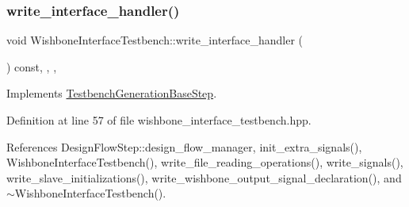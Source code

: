 \subsubsection{\texorpdfstring{write\+\_\+interface\+\_\+handler()}{write\_interface\_handler()}}
{\footnotesize\ttfamily void Wishbone\+Interface\+Testbench\+::write\+\_\+interface\+\_\+handler (\begin{DoxyParamCaption}{ }\end{DoxyParamCaption}) const\hspace{0.3cm}{\ttfamily [inline]}, {\ttfamily [override]}, {\ttfamily [protected]}, {\ttfamily [virtual]}}



Implements \hyperlink{classTestbenchGenerationBaseStep_a7568b1b1e16628fecd673da73e8ed71b}{Testbench\+Generation\+Base\+Step}.



Definition at line 57 of file wishbone\+\_\+interface\+\_\+testbench.\+hpp.



References Design\+Flow\+Step\+::design\+\_\+flow\+\_\+manager, init\+\_\+extra\+\_\+signals(), Wishbone\+Interface\+Testbench(), write\+\_\+file\+\_\+reading\+\_\+operations(), write\+\_\+signals(), write\+\_\+slave\+\_\+initializations(), write\+\_\+wishbone\+\_\+output\+\_\+signal\+\_\+declaration(), and $\sim$\+Wishbone\+Interface\+Testbench().

